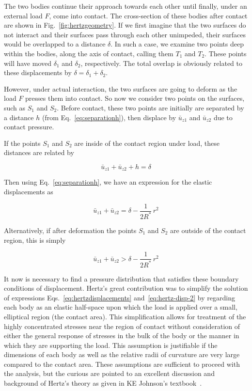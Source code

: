 The two bodies continue their approach towards each other until finally, under an external load $F$, come into contact. The cross-section of these bodies after contact are shown in Fig.~\ref{fig:hertzgeometry}. If we first imagine that the two surfaces do not interact and their surfaces pass through each other unimpeded, their surfaces would be overlapped to a distance $\delta$. In such a case, we examine two points deep within the bodies, along the axis of contact, calling them $T_{1}$ and $T_2$. These points will have moved $\delta_1$ and $\delta_2$, respectively. The total overlap is obviously related to these displacements by $\delta = \delta_1 + \delta_2$. 

However, under actual interaction, the two surfaces are going to deform as the load $F$ presses them into contact. So now we consider two points on the surfaces, such as $S_1$ and $S_2$. Before contact, these two points are initially are separated by a distance $h$ (from Eq.~\ref{eq:separationh}), then displace by $\bar{u}_{z1}$ and $\bar{u}_{z2}$ due to contact pressure. 

If the points $S_1$ and $S_2$ are inside of the contact region under load, these distances are related by

\begin{equation}
	\bar{u}_{z1} + \bar{u}_{z2} + h = \delta
\end{equation}

Then using Eq.~\ref{eq:separationh}, we have an expression for the elastic displacements as

\begin{equation}\label{eq:hertzdisplacements}
	\bar{u}_{z1} + \bar{u}_{z2} = \delta - \frac{1}{2R^*} \, r^2
\end{equation}

Alternatively, if after deformation the points $S_1$ and $S_2$ are outside of the contact region, this is simply

\begin{equation}\label{eq:hertz-disp-2}
	\bar{u}_{z1} + \bar{u}_{z2} > \delta - \frac{1}{2R^*} \, r^2
\end{equation}

It now is necessary to find a pressure distribution that satisfies these boundary conditions of displacement. Hertz's great contribution was to simplify the solution of expressions Eqs.~\ref{eq:hertzdisplacements} and~\ref{eq:hertz-disp-2} by regarding each body as an elastic half-space upon which the load is applied over a small, elliptical region (the contact area). This simplification allows for treatment of the highly concentrated stresses near the region of contact without consideration of either the general response of stresses in the bulk of the body or the manner in which they are supporting the load. This assumption is justifiable if the dimensions of each body as well as the relative radii of curvature are very large compared to the contact area. These assumptions are sufficient to proceed with the analysis, but the curious are pointed to an excellent discussion and background of Hertz's theory as given in KE Johnson's textbook~\cite{Johnson1985}.

